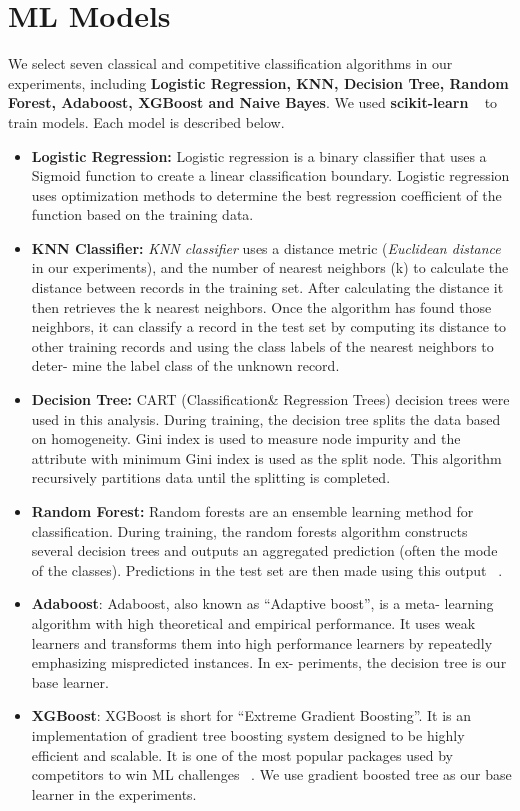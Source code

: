 \section{ML Models}

We select seven classical and competitive classification algorithms in our experiments, including \textbf{Logistic Regression, KNN, Decision Tree, Random Forest, Adaboost, XGBoost and Naive Bayes}.
We used \textbf{scikit-learn} ~\cite{Scikit-learn:2011} to train models. Each model is described
below.


\begin{itemize}
	\item { \textbf{Logistic Regression:}
	Logistic regression is a binary classifier that
	uses a Sigmoid function to create a linear classification boundary. Logistic regression uses optimization methods to determine
	the best regression coefficient of the function based on the training data. ~\cite{McFadden1973}
}

\item {
	\textbf{KNN Classifier:} \textit{KNN classifier} uses a distance metric (\textit{Euclidean
	distance} in our experiments), and the number of nearest neighbors
	(k) to calculate the distance between records in the training set.
	After calculating the distance it then retrieves the k nearest neighbors. Once the algorithm has found those neighbors, it can classify
	a record in the test set by computing its distance to other training
	records and using the class labels of the nearest neighbors to deter-
	mine the label class of the unknown record. ~\cite{HastieTibshirani}
}

\item {
\textbf{Decision Tree:} CART (Classification\& Regression Trees) decision trees were used in this analysis. During training, the decision
	tree splits the data based on homogeneity. Gini index is used to
	measure node impurity and the attribute with minimum Gini index
	is used as the split node. This algorithm recursively partitions data
	until the splitting is completed. ~\cite{Quinlan1986}
}
\item{
   \textbf{Random Forest:} Random forests are an ensemble learning method
	for classification. During training, the random forests algorithm
	constructs several decision trees and outputs an aggregated prediction (often the mode of the classes). Predictions in the test set are
	then made using this output ~\cite{CuiChen2015}.
}

\item {
	\textbf{Adaboost}: Adaboost, also known as “Adaptive boost”, is a meta-
	learning algorithm with high theoretical and empirical performance.
	It uses weak learners and transforms them into high performance
	learners by repeatedly emphasizing mispredicted instances. In ex-
	periments, the decision tree is our base learner. ~\cite{Hastie2009}
}
\item {
	\textbf{XGBoost}: XGBoost is short for “Extreme Gradient Boosting”. It is
	an implementation of gradient tree boosting system designed to be
	highly efficient and scalable. It is one of the most popular packages
	used by competitors to win ML challenges ~\cite{Guestrin2016}. We use gradient
	boosted tree as our base learner in the experiments.
}


\end{itemize}
